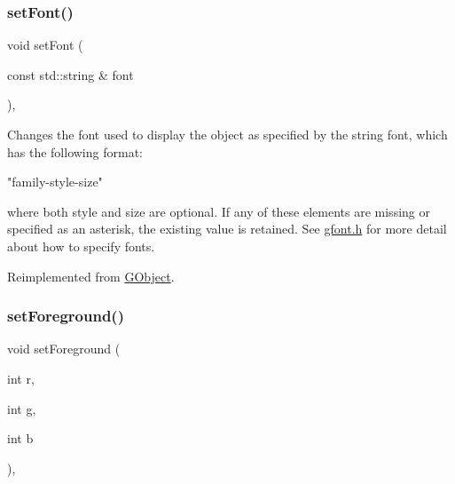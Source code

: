 \mbox{\label{classsgl_1_1GText_a51367c9fd2709973b1f7238734f93891}} 
\subsubsection{\texorpdfstring{set\+Font()}{setFont()}\hspace{0.1cm}{\footnotesize\ttfamily [2/2]}}
{\footnotesize\ttfamily void set\+Font (\begin{DoxyParamCaption}\item[{const std\+::string \&}]{font }\end{DoxyParamCaption})\hspace{0.3cm}{\ttfamily [override]}, {\ttfamily [virtual]}}



Changes the font used to display the object as specified by the string {\ttfamily font}, which has the following format\+: 


\begin{DoxyPre}
"family-style-size"
\end{DoxyPre}


where both {\ttfamily style} and {\ttfamily size} are optional. If any of these elements are missing or specified as an asterisk, the existing value is retained. See \mbox{\hyperlink{gfont_8h_source}{gfont.\+h}} for more detail about how to specify fonts. 

Reimplemented from \mbox{\hyperlink{classsgl_1_1GObject_a8e096e8818d838aceae1d46d58fb3a7b}{G\+Object}}.

\mbox{\label{classsgl_1_1GObject_ad18e8fab1e02a4e9b75c6730212558eb}} 
\subsubsection{\texorpdfstring{set\+Foreground()}{setForeground()}\hspace{0.1cm}{\footnotesize\ttfamily [1/3]}}
{\footnotesize\ttfamily void set\+Foreground (\begin{DoxyParamCaption}\item[{int}]{r,  }\item[{int}]{g,  }\item[{int}]{b }\end{DoxyParamCaption})\hspace{0.3cm}{\ttfamily [virtual]}, {\ttfamily [inherited]}}



